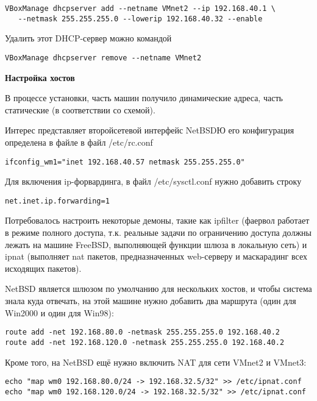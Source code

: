 \documentclass[a4paper, 12pt]{article}		%
\begin{document}
\begin{Verbatim}[frame=single]
VBoxManage dhcpserver add --netname VMnet2 --ip 192.168.40.1 \
   --netmask 255.255.255.0 --lowerip 192.168.40.32 --enable
\end{Verbatim}

Удалить этот DHCP-сервер можно командой

\begin{Verbatim}[frame=single]
VBoxManage dhcpserver remove --netname VMnet2
\end{Verbatim}

\textbf{Настройка хостов}

В процессе установки, часть машин получило динамические адреса, часть статические (в соответствии со схемой).

Интерес представляет второйсетевой интерфейс NetBSDЮ его конфигурация определена в файле в файл /etc/rc.conf
\begin{Verbatim}[frame=single]
ifconfig_wm1="inet 192.168.40.57 netmask 255.255.255.0"
\end{Verbatim}

Для включения ip-форвардинга, в файл /etc/sysctl.conf нужно добавить строку
\begin{Verbatim}[frame=single]
net.inet.ip.forwarding=1
\end{Verbatim}

Потребовалось настроить некоторые демоны, такие как ipfilter (фаервол работает в режиме полного доступа, т.к. реальные задачи по ограничению доступа должны лежать на машине FreeBSD, выполняющей функции шлюза в локальную сеть) и ipnat (выполняет nat пакетов, предназначенных web-серверу и маскарадинг всех исходящих пакетов).

NetBSD является шлюзом по умолчанию для нескольких хостов, и чтобы система знала куда отвечать, на этой машине нужно добавить два маршрута (один для Win2000 и один для Win98):
\begin{Verbatim}[frame=single]
route add -net 192.168.80.0 -netmask 255.255.255.0 192.168.40.2
route add -net 192.168.120.0 -netmask 255.255.255.0 192.168.40.2
\end{Verbatim}

Кроме того, на NetBSD ещё нужно включить NAT для сети VMnet2 и VMnet3:
\begin{Verbatim}[frame=single]
echo "map wm0 192.168.80.0/24 -> 192.168.32.5/32" >> /etc/ipnat.conf
echo "map wm0 192.168.120.0/24 -> 192.168.32.5/32" >> /etc/ipnat.conf
\end{Verbatim}
\end{document}

